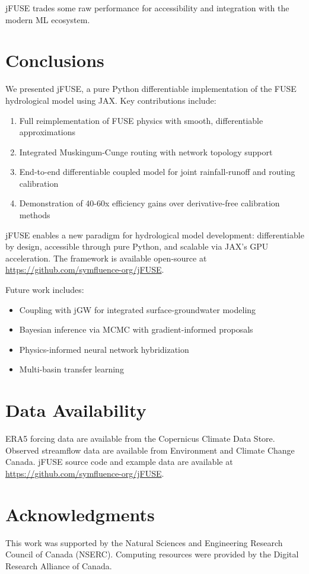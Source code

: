 \documentclass[11pt,a4paper]{article}
\begin{document}
jFUSE trades some raw performance for accessibility and integration with the modern ML ecosystem.

\section{Conclusions}

We presented jFUSE, a pure Python differentiable implementation of the FUSE hydrological model using JAX. Key contributions include:

\begin{enumerate}
    \item Full reimplementation of FUSE physics with smooth, differentiable approximations
    \item Integrated Muskingum-Cunge routing with network topology support
    \item End-to-end differentiable coupled model for joint rainfall-runoff and routing calibration
    \item Demonstration of 40-60x efficiency gains over derivative-free calibration methods
\end{enumerate}

jFUSE enables a new paradigm for hydrological model development: differentiable by design, accessible through pure Python, and scalable via JAX's GPU acceleration. The framework is available open-source at \url{https://github.com/symfluence-org/jFUSE}.

Future work includes:
\begin{itemize}
    \item Coupling with jGW for integrated surface-groundwater modeling
    \item Bayesian inference via MCMC with gradient-informed proposals
    \item Physics-informed neural network hybridization
    \item Multi-basin transfer learning
\end{itemize}

\section*{Data Availability}

ERA5 forcing data are available from the Copernicus Climate Data Store. Observed streamflow data are available from Environment and Climate Change Canada. jFUSE source code and example data are available at \url{https://github.com/symfluence-org/jFUSE}.

\section*{Acknowledgments}

This work was supported by the Natural Sciences and Engineering Research Council of Canada (NSERC). Computing resources were provided by the Digital Research Alliance of Canada.



\end{document}
